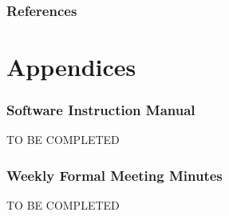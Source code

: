 \documentclass[10pt,a4paper]{article}
\begin{document}
\section{References}
\pagebreak
\part{Appendices}



\section{Software Instruction Manual}
TO BE COMPLETED
\section{Weekly Formal Meeting Minutes}
TO BE COMPLETED
\end{document}
